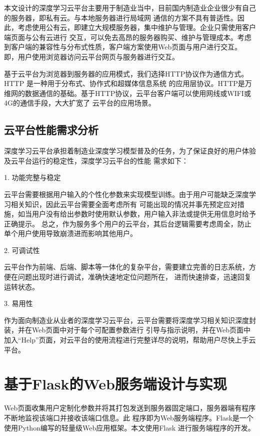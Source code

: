 本文设计的深度学习云平台主要用于制造业当中，目前国内制造业企业很少有自己的服务器，即私有云。与本地服务器进行局域网
通信的方案不具有普适性。因此，考虑使用公有云，即建立大规模服务器，集中维护与管理。企业只需使用客户端页面与公有云进行
交互，可以免去高昂的服务器购买、维护与管理成本。考虑到客户端的兼容性与分布式性质，客户端方案使用Web页面与用户进行交互。
即，用户使用浏览器访问云平台网页与服务器进行交互。

基于云平台为浏览器到服务器的应用模式，我们选择HTTP协议作为通信方式。HTTP \cite{HTTP} 是一种用于分布式、协作式和超媒体信息系统
的应用层协议。HTTP是万维网的数据通信的基础。基于HTTP协议，云平台客户端可以使用网线或WIFI或4G的通信手段，大大扩宽了
云平台的应用场景。

\subsection{云平台性能需求分析}

深度学习云平台承担着制造业深度学习模型普及的任务，为了保证良好的用户体验及云平台运行的稳定性，深度学习云平台的性能
需求如下：

1. 功能完整与稳定

云平台需要根据用户输入的个性化参数来实现模型训练。由于用户可能缺乏深度学习相关知识，因此云平台需要全面考虑所有
可能出现的情况并事先预定应对措施，如当用户没有给出参数时使用默认参数，用户输入非法或提供无用信息时给予正确提示。
总之，作为服务多个用户的云平台，其后台逻辑需要考虑周全，防止单个用户使用导致崩溃进而影响其他用户。

2. 可调试性

云平台作为前端、后端、脚本等一体化的复杂平台，需要建立完善的日志系统，方便在问题出现时进行调试，准确快速地定位问题所在，
进而快速排查，迅速回复运转状态。

3. 易用性

作为面向制造业从业者的深度学习云平台，云平台需要将深度学习相关知识深度封装，并在Web页面中对于每个可配置参数进行
引导与指示说明，并在Web页面中加入“Help”页面，对云平台的使用流程进行完整详尽的说明，帮助用户尽快上手云平台。

\section{基于Flask的Web服务端设计与实现}

Web页面收集用户定制化参数并将其打包发送到服务器固定端口，服务器端有程序不断地监视该端口并接收该端口信息。此
程序即为Web服务端程序。Flask是一个使用Python编写的轻量级Web应用框架。本文使用Flask \cite{Flask} 进行服务端程序的开发。

